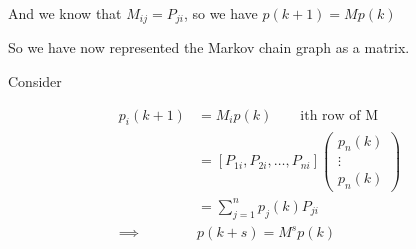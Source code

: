\documentclass[10pt]{article}
\begin{document}
And we know that $ M_{ij} = P_{ji} $, so we have $ p(k+1) = Mp(k)$  

So we have now represented the Markov chain graph as a matrix.

Consider 

\begin{equation}
	\begin{split}
		p_i(k+1) &= M_i p(k) \qquad \text{ith row of M} \\
						 &= [P_{1i}, P_{2i}, \ldots, P_{ni}] \begin{pmatrix} p_n(k)\\ \vdots\\ p_n(k) \end{pmatrix}  \\
						 &= \sum_{j=1}^n p_{j}(k) P_{ji} \\
		\implies & p(k+s) = M^s p(k) \\
	\end{split}
\end{equation}
\end{document}
